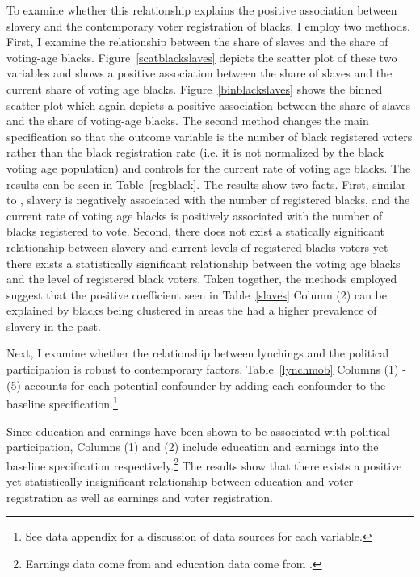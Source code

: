 \documentclass[AEJ, finalmode]{AEA}
\begin{document}
To examine whether this relationship explains the positive association between slavery and the contemporary voter registration of blacks, I employ two methods. First, I examine the relationship between the share of slaves and the share of voting-age blacks. Figure~\ref{scatblackslaves} depicts the scatter plot of these two variables and shows a positive association between the share of slaves and the current share of voting age blacks. Figure~\ref{binblackslaves} shows the binned scatter plot which again depicts a positive association between the share of slaves and the share of voting-age blacks. The second method changes the main specification so that the outcome variable is the number of black registered voters rather than the black registration rate (i.e. it is not normalized by the black voting age population) and controls for the current rate of voting age blacks. The results can be seen in Table~\ref{regblack}. The results show two facts. First, similar to , slavery is negatively associated with the number of registered blacks, and the current rate of voting age blacks is positively associated with the number of blacks registered to vote. Second, there does not exist a statically significant relationship between slavery and current levels of registered blacks voters yet there exists a statistically significant relationship between the voting age blacks and the level of registered black voters. Taken together, the methods employed suggest that the positive coefficient seen in Table~\ref{slaves} Column (2) can be explained by blacks being clustered in areas the had a higher prevalence of slavery in the past. 

Next, I examine whether the relationship between lynchings and the political participation is robust to contemporary factors. Table~\ref{lynchmob} Columns (1) - (5) accounts for each potential confounder by adding each confounder to the baseline specification.\footnote{See data appendix for a discussion of data sources for each variable.} 

Since education and earnings have been shown to be associated with political participation, Columns (1) and (2) include education and earnings into the baseline specification respectively.\footnote{Earnings data come from  and education data come from .} The results show that there exists a positive yet statistically insignificant relationship between education and voter registration as well as earnings and voter registration. 
 
\end{document}
